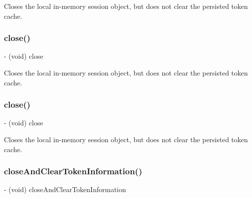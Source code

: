 Closes the local in-\/memory session object, but does not clear the persisted token cache. \mbox{\label{interfaceFBSession_a91eccb960e90fc8cc6d24df1b2e94ce3}} 
\subsubsection{\texorpdfstring{close()}{close()}\hspace{0.1cm}{\footnotesize\ttfamily [4/5]}}
{\footnotesize\ttfamily -\/ (void) close \begin{DoxyParamCaption}{ }\end{DoxyParamCaption}}

Closes the local in-\/memory session object, but does not clear the persisted token cache. \mbox{\label{interfaceFBSession_a91eccb960e90fc8cc6d24df1b2e94ce3}} 
\subsubsection{\texorpdfstring{close()}{close()}\hspace{0.1cm}{\footnotesize\ttfamily [5/5]}}
{\footnotesize\ttfamily -\/ (void) close \begin{DoxyParamCaption}{ }\end{DoxyParamCaption}}

Closes the local in-\/memory session object, but does not clear the persisted token cache. \mbox{\label{interfaceFBSession_ac4ad0564da77b3cecc0c67f762f5f1c7}} 
\subsubsection{\texorpdfstring{close\+And\+Clear\+Token\+Information()}{closeAndClearTokenInformation()}\hspace{0.1cm}{\footnotesize\ttfamily [1/5]}}
{\footnotesize\ttfamily -\/ (void) close\+And\+Clear\+Token\+Information \begin{DoxyParamCaption}{ }\end{DoxyParamCaption}}

